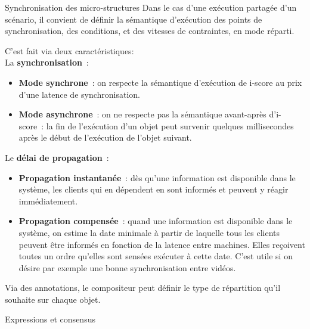 \begin{block}{Synchronisation des micro-structures}
    Dans le cas d'une exécution partagée d'un scénario, il convient de définir la sémantique d'exécution des points de synchronisation, des conditions, et des vitesses de contraintes, en mode réparti. 
   
    C'est fait via deux caractéristiques:~\\
    La \textbf{synchronisation}~:
	\begin{itemize}
		\item \textbf{Mode synchrone}~: on respecte la sémantique d'exécution de i-score au prix d'une latence de synchronisation.
		\item \textbf{Mode asynchrone}~: on ne respecte pas la sémantique avant-après d'i-score~: la fin de l'exécution d'un objet peut survenir quelques millisecondes après le début de l'exécution de l'objet suivant.
	\end{itemize}

Le \textbf{délai de propagation}~:
\begin{itemize}
    \item \textbf{Propagation instantanée}~: dès qu'une information est disponible dans le système, les clients qui en dépendent en sont informés et peuvent y réagir immédiatement. 
    \item \textbf{Propagation compensée}~: quand une information est disponible dans le système, on estime la date minimale à partir de laquelle tous les clients peuvent être informés en fonction de la latence entre machines. Elles reçoivent toutes un ordre qu'elles sont sensées exécuter à cette date. C'est utile si on désire par exemple une bonne synchronisation entre vidéos.
\end{itemize}

Via des annotations, le compositeur peut définir le type de répartition qu'il souhaite sur chaque objet.
\end{block}
\begin{block}{Expressions et consensus}
\end{block}